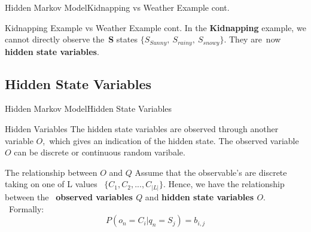 \documentclass[10pt]{beamer}
\begin{document}
\begin{frame}{Hidden Markov Model}{Kidnapping vs Weather Example cont.}
   \begin{block}{Kidnapping Example vs Weather Example cont.}
     In the \textbf{Kidnapping} example, we cannot directly observe the\
     \textbf{S} states {$\{S_{Sunny},\ S_{rainy},\ S_{snowy}\}$}. They are\
     now \textbf{hidden state variables}.
   \end{block}
\end{frame}

\subsection{Hidden State Variables}
\begin{frame}[allowframebreaks]{Hidden Markov Model}{Hidden State Variables}
   \begin{block}{Hidden Variables}
       The hidden state variables are observed through another variable $O$,\
       which gives an indication of the hidden state. \cite{Anders} 
       The observed variable $O$ can be discrete or continuous random varibale.
   \end{block}
   \begin{block}{The relationship between $O$ and $Q$}
        Assume that the observable's are discrete taking on one of L values \
        $\{C_1, C_2,...,C_{|L|}\}$. Hence, we have the relationship between the\
       \textbf{ observed variables $Q$} and \textbf{hidden state variables $O$}. \
       Formally:\\
             \begin{equation}
             \label{rela_M_Y}
                  P(o_n = C_i|q_n = S_j) = b_{i,j}
             \end{equation}
   \end{block}
\end{frame}

\end{document}
